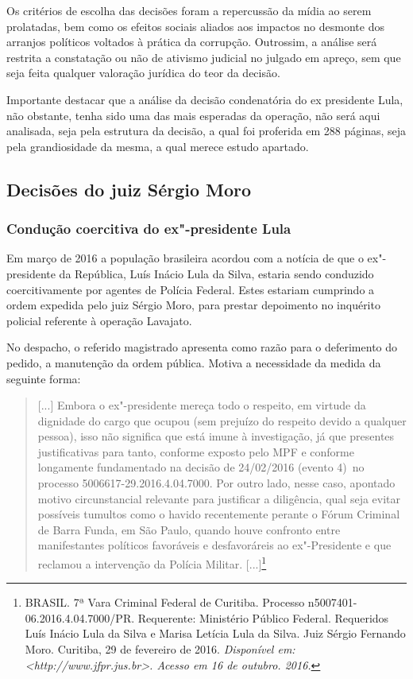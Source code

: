 {Os critérios de escolha das decisões foram a repercussão da mídia ao
serem prolatadas, bem como os efeitos sociais aliados aos impactos no
desmonte dos arranjos políticos voltados à prática da corrupção.
Outrossim, a análise será restrita a constatação ou não de ativismo
judicial no julgado em apreço, sem que seja feita qualquer valoração
jurídica do teor da decisão.

Importante destacar que a análise da decisão condenatória do ex
presidente Lula, não obstante, tenha sido uma das mais esperadas da
operação, não será aqui analisada, seja pela estrutura da decisão, a
qual foi proferida em 288 páginas, seja pela grandiosidade da mesma, a
qual merece estudo apartado.

\subsection{Decisões do juiz Sérgio Moro}

\subsubsection{Condução coercitiva do ex"-presidente Lula}

Em março de 2016 a população brasileira acordou com a notícia de que o
ex"-presidente da República, Luís Inácio Lula da Silva, estaria sendo
conduzido coercitivamente por agentes de Polícia Federal. Estes estariam
cumprindo a ordem expedida pelo juiz Sérgio Moro, para prestar
depoimento no inquérito policial referente à operação Lavajato.

No despacho, o referido magistrado apresenta como razão para o
deferimento do pedido, a manutenção da ordem pública. Motiva a
necessidade da medida da seguinte forma:

\begin{quote}
{[}...{]} Embora o ex"-presidente mereça todo o respeito, em virtude da
dignidade do cargo que ocupou (sem prejuízo do respeito devido a
qualquer pessoa), isso não significa que está imune à investigação, já
que presentes justificativas para tanto, conforme exposto pelo MPF e
conforme longamente fundamentado na decisão de 24/02/2016 (evento 4)~no
processo 5006617-29.2016.4.04.7000. Por outro lado, nesse caso, apontado
motivo circunstancial relevante para justificar a diligência, qual seja
evitar possíveis tumultos como o havido recentemente perante o Fórum
Criminal de Barra Funda, em São Paulo, quando houve confronto entre
manifestantes políticos favoráveis e desfavoráreis ao ex"-Presidente e
que reclamou a intervenção da Polícia Militar. {[}...{]}\footnote{BRASIL.
  7ª Vara Criminal Federal de Curitiba. Processo
  n5007401-06.2016.4.04.7000/PR. Requerente: Ministério Público Federal.
  Requeridos Luís Inácio Lula da Silva e Marisa Letícia Lula da Silva.
  Juiz Sérgio Fernando Moro. Curitiba, 29 de fevereiro de 2016.
  \emph{Disponível em: \textless{}http://www.jfpr.jus.br\textgreater{}.
  Acesso em 16 de outubro. 2016.}}
\end{quote}

}
